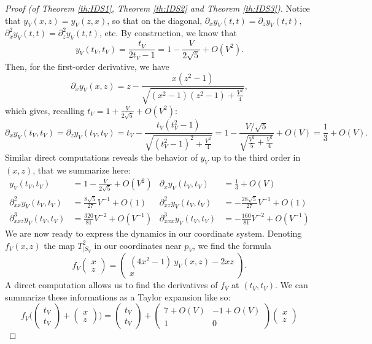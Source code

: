 \documentclass[10pt,a4paper]{amsart}
\begin{document}
\begin{proof}[Proof (of Theorem \ref{th:IDS1}, Theorem \ref{th:IDS2} and Theorem \ref{th:IDS3})]
Notice that $y_V(x,z)=y_V(z,x)$, so that on the diagonal, $\partial_x y_V(t,t) = \partial_z y_V(t,t),$ $\partial_x^2 y_V(t,t) = \partial_z^2 y_V(t,t)$, etc. By construction, we know that $$y_V(t_V,t_V) = \frac{t_V}{2t_V-1} = 1-\frac{V}{2\sqrt{5}} + O(V^2).$$
Then, for the first-order derivative, we have
$$ \partial_x y_V(x,z) = z - \frac{x(z^2-1)}{\sqrt{(x^2-1)(z^2-1)+\frac{V^2}{4}}}, $$
which gives, recalling $t_V=1+\frac{V}{2\sqrt{5}} + O(V^2)$: $$ \partial_x y_V(t_V,t_V) = \partial_z y_V(t_V,t_V) = t_V - \frac{t_V(t_V^2-1)}{\sqrt{(t_V^2-1)^2+\frac{V^2}{4}}} = 1 - \frac{V/\sqrt{5}}{\sqrt{\frac{V^2}{5}+\frac{V^2}{4}}} + O(V) = \frac{1}{3} + O(V). $$
Similar direct computations reveals the behavior of $y_V$ up to the third order in $(x,z)$, that we summarize here:
\begin{align*}
    y_V(t_V,t_V) &= 1-\frac{V}{2\sqrt{5}} + O(V^2)  & \partial_x y_V(t_V,t_V) &= \frac{1}{3} + O(V) \\
    \partial_{xx}^2 y_V(t_V,t_V) &= \frac{8\sqrt{5}}{27} V^{-1} + O(1) &
    \partial_{xz}^2 y_V(t_V,t_V) &= -\frac{28\sqrt{5}}{27} V^{-1} + O(1) \\
    \partial_{xxz}^3 y_V(t_V,t_V) &= \frac{320}{81} V^{-2} + O(V^{-1}) &
    \partial_{xxx}^3 y_V(t_V,t_V) &= -\frac{160}{81} V^{-2} + O(V^{-1})
\end{align*}
We are now ready to express the dynamics in our coordinate system. Denoting $f_V(x,z)$ the map $T^2_{|S_V}$ in our coordinates near $p_V$, we find the formula
$$ f_V\begin{pmatrix} x \\ z \end{pmatrix} = \begin{pmatrix} (4x^2-1) \ y_V(x,z)-2xz \\ x \end{pmatrix} .$$
A direct computation allows us to find the derivatives of $f_V$ at $(t_V,t_V)$. We can summarize these informations as a Taylor expansion like so:
$$ f_V\Big( \begin{pmatrix} t_V \\ t_V \end{pmatrix} + \begin{pmatrix} x \\ z \end{pmatrix} \Big)  =  \begin{pmatrix} t_V \\ t_V \end{pmatrix}+\begin{pmatrix} 7 + O(V) & -1 + O(V) \\ 1 & 0 \end{pmatrix}  \begin{pmatrix} x \\ z \end{pmatrix}  $$

\end{proof}
\end{document}
